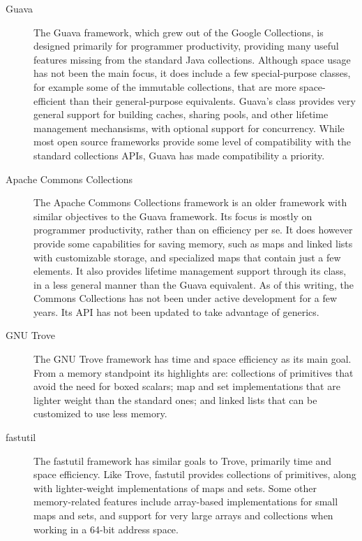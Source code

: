 \begin{description}

\item[Guava] The Guava framework, which grew out of the Google Collections,
is designed primarily for programmer productivity, providing many useful
features missing from the standard Java collections. 
Although space usage has not been the main focus, it does include a
few special-purpose classes, for example some of the immutable collections, that
are more space-efficient than their general-purpose equivalents. Guava's 
class provides very general support for 
building caches, sharing pools, and other lifetime management mechansisms,
with optional support for concurrency. While most open source frameworks provide some level of compatibility with the
standard collections APIs, Guava has made compatibility a priority.

\item[Apache Commons Collections] The Apache Commons Collections framework
is an older framework with similar objectives to the Guava framework.
Its focus is mostly on programmer productivity, rather than on efficiency per
se.
It does however provide some capabilities for saving memory, such as
maps and linked lists with customizable storage, and specialized 
maps that contain just a few elements. It also provides lifetime management
support through its  class, in a less general
manner than the Guava equivalent. As of this writing, the Commons Collections 
has not been under active development for a few years. Its API has
not been updated to take advantage of generics.

\item[GNU Trove] The GNU Trove framework has time and space efficiency as
its main goal.
From a memory standpoint its highlights are: collections of primitives that
avoid the need for boxed scalars;  map
and set implementations that are lighter weight than the standard ones; and
linked lists that can be customized to use less memory.

\item[fastutil] The fastutil framework has similar goals to Trove,
primarily time and space efficiency. Like Trove, fastutil provides collections
of primitives, along with lighter-weight implementations of maps and sets. Some
other memory-related features include array-based implementations for small
maps and sets, and support for very large arrays and collections when working
in a 64-bit address space.

\end{description}

